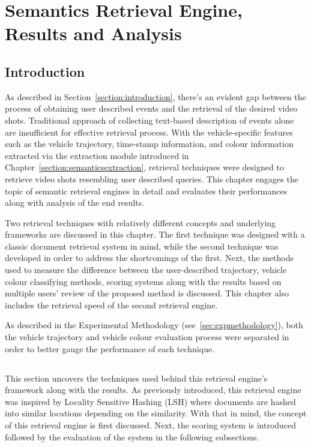 
\chapter{Semantics Retrieval Engine, Results and Analysis}

\label{section:retrievalengine}
\section{Introduction}

As described in Section~\ref{section:introduction}, there's an evident gap between the process of obtaining user described events and the retrieval of the desired video shots. Traditional approach of collecting text-based description of events alone are insufficient for effective retrieval process. With the vehicle-specific features such as the vehicle trajectory, time-stamp information, and colour information extracted via the extraction module introduced in Chapter~\ref{section:semanticsextraction}, retrieval techniques were designed to retrieve video shots resembling user described queries. This chapter engages the topic of semantic retrieval engines in detail and evaluates their performances along with analysis of the end results.

Two retrieval techniques with relatively different concepts and underlying frameworks are discussed in this chapter. The first technique was designed with a classic document retrieval system in mind, while the second technique was developed in order to address the shortcomings of the first. Next, the methods used to measure the difference between the user-described trajectory, vehicle colour classifying methods, scoring systems along with the results based on multiple users' review of the proposed method is discussed. This chapter also includes the retrieval speed of the second retrieval engine.

As described in the Experimental Methodology (see~\ref{sec:expmethodology}), both the vehicle trajectory and vehicle colour evaluation process were separated in order to better gauge the performance of each technique.

\section{\versionOneRet}
\label{section:versionOne}
This section uncovers the techniques used behind this retrieval engine's framework along with the results. As previously introduced, this retrieval engine was inspired by Locality Sensitive Hashing (LSH) where documents are hashed into similar locations depending on the similarity. With that in mind,  the concept of this retrieval engine is first discussed. Next, the scoring system is introduced followed by the evaluation of the system in the following subsections.

